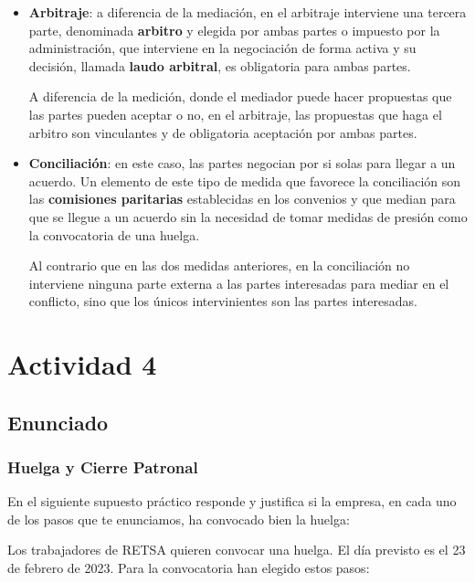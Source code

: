 \begin{enumerate}
\begin{itemize}
        \item \textbf{Arbitraje}: a diferencia de la mediación, en el arbitraje interviene una tercera parte, denominada \textbf{arbitro} y elegida por ambas partes o impuesto por la administración, que interviene en la negociación de forma activa y su decisión, llamada \textbf{laudo arbitral}, es obligatoria para ambas partes.

        A diferencia de la medición, donde el mediador puede hacer propuestas que las partes pueden aceptar o no, en el arbitraje, las propuestas que haga el arbitro son vinculantes y de obligatoria aceptación por ambas partes.

        \item \textbf{Conciliación}: en este caso, las partes negocian por si solas para llegar a un acuerdo. Un elemento de este tipo de medida que favorece la conciliación son las \textbf{comisiones paritarias} establecidas en los convenios y que median para que se llegue a un acuerdo sin la necesidad de tomar medidas de presión como la convocatoria de una huelga.

        Al contrario que en las dos medidas anteriores, en la conciliación no interviene ninguna parte externa a las partes interesadas para mediar en el conflicto, sino que los únicos intervinientes son las partes interesadas.
    \end{itemize}
\end{enumerate}

\section{Actividad 4}
\subsection{Enunciado}

\subsubsection*{Huelga y Cierre Patronal}
En el siguiente supuesto práctico responde y justifica si la empresa, en cada uno de los pasos que te enunciamos, ha convocado bien la huelga:

Los trabajadores de RETSA quieren convocar una huelga. El día previsto es el 23 de febrero de 2023. Para la convocatoria han elegido estos pasos:

